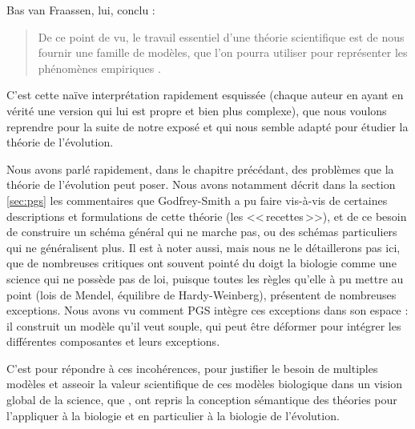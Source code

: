 Bas van Fraassen, lui, conclu :
\begin{quote}
	De ce point de vu, le travail essentiel d'une théorie scientifique est de nous fournir une famille de modèles, que l'on pourra utiliser pour représenter les phénomènes empiriques \citep{vanfraassen1972aformalapproachtothephilosophyofscience}.
\end{quote}

C'est cette naïve interprétation rapidement esquissée (chaque auteur en ayant en vérité une version qui lui est propre et bien plus complexe), que nous voulons reprendre pour la suite de notre exposé et qui nous semble adapté pour étudier la théorie de l'évolution.

Nous avons parlé rapidement, dans le chapitre précédant, des problèmes que la théorie de l'évolution peut poser. Nous avons notamment décrit dans la section \ref{sec:pgs} les commentaires que Godfrey-Smith a pu faire vis-à-vis de certaines descriptions et formulations de cette théorie (les <<\,recettes\,>>), et de ce besoin de construire un schéma général qui ne marche pas, ou des schémas particuliers qui ne généralisent plus. Il est à noter aussi, mais nous ne le détaillerons pas ici, que de nombreuses critiques ont souvent pointé du doigt la biologie comme une science qui ne possède pas de loi, puisque toutes les règles qu'elle à pu mettre au point (lois de Mendel, équilibre de Hardy-Weinberg), présentent de nombreuses exceptions. Nous avons vu comment PGS intègre ces exceptions dans son espace : il construit un modèle qu'il veut souple, qui peut être déformer pour intégrer les différentes composantes et leurs exceptions. 

C'est pour répondre à ces incohérences, pour justifier le besoin de multiples modèles et asseoir la valeur scientifique de ces modèles biologique dans un vision global de la science, que \cite{beatty1980whatswrongwithreceivedwiew,beatty1980ptimaldesignmodelsandstrategyofmodelbuildinginevolutionarybiology,beatty1987onbehalfofsemanticview,thompson1989thestructureofbiologicaltheories,thompson1987adefenceofthesemanticconceptionofevolutionarytheory,lloyd1984asmanticapproachtothestructureofpopulationgenetics,lloyd1988thesemanticapproachanditsapplicationtoevolutionarytheory}, ont repris la conception sémantique des théories pour l'appliquer à la biologie et en particulier à la biologie de l'évolution.

